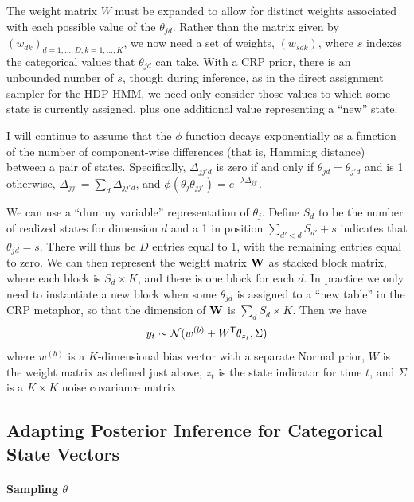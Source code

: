 The weight matrix $W$ must be expanded to allow for distinct weights
associated with each possible value of the $\theta_{jd}$.  Rather than
the matrix given by $(w_{dk})_{d=1,\dots,D,k=1,\dots,K}$, we now need
a set of weights, $(w_{sdk})$, where $s$ indexes the categorical
values that $\theta_{jd}$ can take.  With a CRP prior, 
there is an unbounded number of $s$, though during inference, as in the direct assignment sampler for the HDP-HMM, we need only consider those values to which some state is currently assigned, plus one additional value representing a ``new'' state.

I will continue to assume that the $\phi$ function
decays exponentially as a function of the number of component-wise
differences (that is, Hamming distance) 
between a pair of states.  Specifically, $\Delta_{jj'd}$ is zero
if and only if $\theta_{jd} = \theta_{j'd}$ and is 1 otherwise,
$\Delta_{jj'} = \sum_{d} \Delta_{jj'd}$, and
$\phi(\theta_{j}\theta_{jj'}) = e^{-\lambda\Delta_{jj'}}$.
  
We can use a ``dummy variable'' representation
of $\theta_j$.  Define $S_d$ to be the number of realized
states for dimension $d$ and a 1 in position $\sum_{d' < d} S_{d'} + s$ indicates that
$\theta_{jd} = s$.  There will thus be $D$ entries equal to 1, with
the remaining entries equal to zero.  We can then represent the weight
matrix $\mathbf{W}$ as stacked block matrix, where each block is $S_d
\times K$, and there is one block for each $d$.  In practice we only
need to instantiate a new block when some $\theta_{jd}$ is assigned to
a ``new table'' in the CRP metaphor, so that the dimension of $\mathbf{W}$ is
$\sum_d S_d \times K$.  Then we have
\begin{equation}
  y_{t} \sim \mathcal{N}(w^{(b)} + W^{\sf T}\theta_{z_t},\Sigma)
\end{equation}
where $w^{(b)}$ is a $K$-dimensional bias vector with a separate Normal
prior, $W$ is the weight matrix as defined just above, $z_t$ is the
state indicator for time $t$, and $\Sigma$ is a $K \times K$ noise covariance matrix.

\subsection{Adapting Posterior Inference for Categorical State Vectors}
\label{sec:adapt-post-infer}

\paragraph{Sampling $\theta$}

